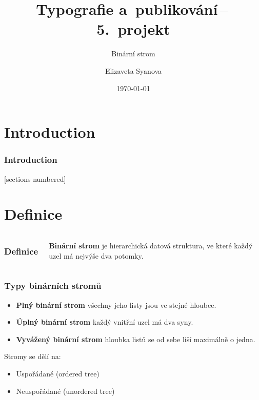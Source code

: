 \documentclass[10pt, hyperref={unicode}, xcolor=dvipsnames]{beamer}
\title{Typografie a~publikování\,--\,5.~projekt}
\subtitle{Binární strom}
\author{Elizaveta Syanova}
\date{\today}
\institute
{
	Vysoké učení technické v~Brně\\
	Fakulta informačních technologií
}
\begin{document}
\maketitle

\section{Introduction}

\begin{frame}
\frametitle{Introduction}
	[sections numbered]
	\tableofcontents[hideallsubsections]

\end{frame}

\section{Definice}


\begin{frame}

    \begin{columns}
    \frametitle{Definice}
    
        \textbf{Binární strom} je hierarchická datová struktura, ve které každý uzel má nejvýše dva potomky. 
    \end{columns} 
\end{frame}


\begin{frame}
    \frametitle{Typy binárních stromů}
    
    \begin{itemize}
        \item<1-> \textbf{Plný binární strom} všechny jeho listy jsou ve stejné hloubce.
        \item<2-> \textbf{Úplný binární strom } každý vnitřní uzel má dva syny.
        \item<3-> \textbf{Vyvážený binární strom } hloubka listů se od sebe liší maximálně o jedna.
    \end{itemize}
\end{frame}



\begin{frame}
    Stromy se dělí na:
    
    
    \begin{itemize}
        \item<1-> Uspořádané (ordered tree)
        \item<2-> Neuspořádané (unordered tree)
    \end{itemize}
\end{frame}
\end{document}
